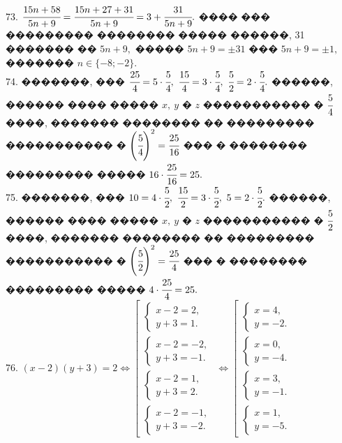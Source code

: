 \documentclass[12pt]{article}
\begin{document}
73. $\cfrac{15n+58}{5n+9}=\cfrac{15n+27+31}{5n+9}=3+\cfrac{31}{5n+9}.$ ���� ��� ��������� �������� ����� ������, 31 ������� �� $5n+9,$ ����� $5n+9=\pm31$ ��� $5n+9=\pm1,$ ������� $n\in\{-8;-2\}.$\\
74. �������, ��� $\cfrac{25}{4}=5\cdot\cfrac{5}{4},\ \cfrac{15}{4}=3\cdot\cfrac{5}{4},\ \cfrac{5}{2}=2\cdot\cfrac{5}{4}.$ ������, ������ ���� ����� $x,\ y$ � $z$ ����������� � $\cfrac{5}{4}$ ����, ������� �������� �� ��������� ����������� �  $\left(\cfrac{5}{4}\right)^2=\cfrac{25}{16}$ ��� � �������� ��������� ����� $16\cdot
\cfrac{25}{16}=25.$\\
75. �������, ��� $10=4\cdot\cfrac{5}{2},\ \cfrac{15}{2}=3\cdot\cfrac{5}{2},\ 5=2\cdot\cfrac{5}{2}.$ ������, ������ ���� ����� $x,\ y$ � $z$ ����������� � $\cfrac{5}{2}$ ����, ������� �������� �� ��������� ����������� �  $\left(\cfrac{5}{2}\right)^2=\cfrac{25}{4}$ ��� � �������� ��������� ����� $4\cdot
\cfrac{25}{4}=25.$\\
76. $(x-2)(y+3)=2\Leftrightarrow \left[\begin{array}{l}\begin{cases}x-2=2,\\ y+3=1.\end{cases}\\ \begin{cases}x-2=-2,\\ y+3=-1.\end{cases}\\
\begin{cases}x-2=1,\\ y+3=2.\end{cases}\\ \begin{cases}x-2=-1,\\ y+3=-2.\end{cases}\end{array}\right.\Leftrightarrow
\left[\begin{array}{l}\begin{cases}x=4,\\ y=-2.\end{cases}\\ \begin{cases} x=0,\\ y=-4.\end{cases}\\
\begin{cases}x=3,\\ y=-1.\end{cases}\\ \begin{cases}x=1,\\ y=-5.\end{cases}\end{array}\right.$\\
\end{document}
